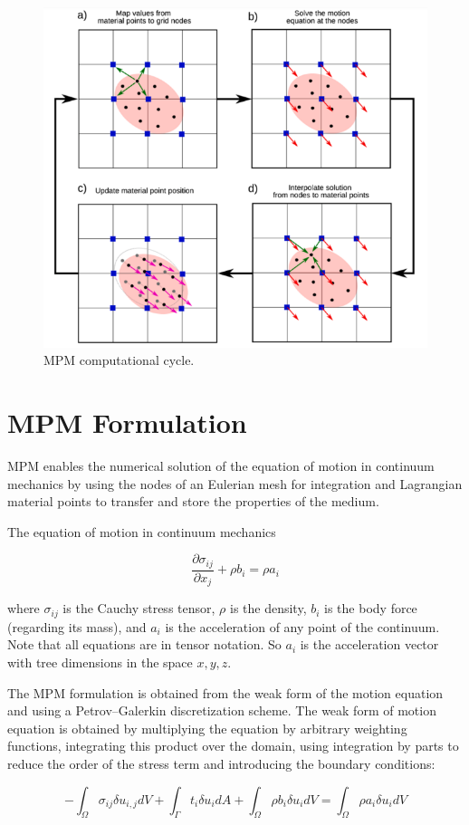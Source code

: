 \documentclass[11pt,a4paper]{article}
\begin{document}
\begin{figure}[h]
  \centering
  \includegraphics[width=.6\linewidth]{figures/mpm_cycle.png}
  \caption{MPM computational cycle.}
  \label{fig:mpm_cycle}
\end{figure}

\section{MPM Formulation}

MPM enables the numerical solution of the equation of motion in continuum mechanics by using the nodes of an Eulerian mesh for integration and Lagrangian material points to transfer and store the properties of the medium.

The equation of motion in continuum mechanics

$$ \frac{\partial \sigma_{ij}}{\partial x_j} + \rho b_i = \rho a_i $$

where $\sigma_{ij} $ is the Cauchy stress tensor, $\rho$ is the density, $ b_i$ is the body force (regarding its mass), and $a_i$ is the acceleration of any point of the continuum.
Note that all equations are in tensor notation. So $a_i$ is the acceleration vector with tree dimensions in the space $x,y,z$.

The MPM formulation is obtained from the weak form of the motion equation and using a Petrov–Galerkin discretization scheme. The weak form of motion equation is obtained by multiplying the equation by arbitrary weighting functions, integrating this product over the domain, using integration by parts to reduce the order of the stress term and introducing the boundary conditions:

$$ -\int_{\Omega} \sigma_{i j} \delta u_{i, j} dV + \int_{\Gamma} t_i \delta u_i dA + \int_{\Omega} \rho b_i \delta u_i dV = \int_{\Omega} \rho a_i \delta u_i dV $$
\end{document}
